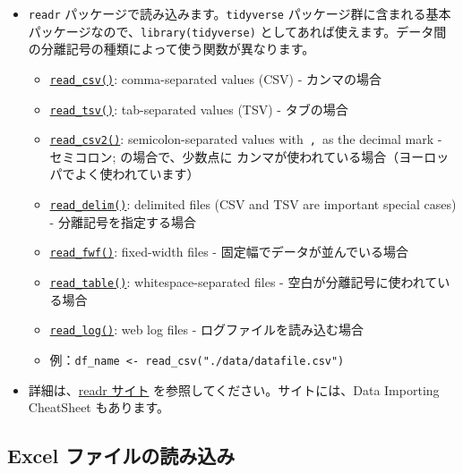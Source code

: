 \documentclass[
  xelatex, ja=standard]{bxjsbook}
\theoremstyle{definition}
\theoremstyle{definition}
\theoremstyle{definition}
\theoremstyle{definition}
\theoremstyle{remark}
\begin{document}
\begin{itemize}
\item
  \texttt{readr} パッケージで読み込みます。\texttt{tidyverse} パッケージ群に含まれる基本パッケージなので、\texttt{library(tidyverse)} としてあれば使えます。データ間の分離記号の種類によって使う関数が異なります。

  \begin{itemize}
  \item
    \href{https://readr.tidyverse.org/reference/read_delim.html}{\texttt{read\_csv()}}: comma-separated values (CSV) - カンマの場合
  \item
    \href{https://readr.tidyverse.org/reference/read_delim.html}{\texttt{read\_tsv()}}: tab-separated values (TSV) - タブの場合
  \item
    \href{https://readr.tidyverse.org/reference/read_delim.html}{\texttt{read\_csv2()}}: semicolon-separated values with~\texttt{,}~as the decimal mark - セミコロン; の場合で、少数点に カンマが使われている場合（ヨーロッパでよく使われています）
  \item
    \href{https://readr.tidyverse.org/reference/read_delim.html}{\texttt{read\_delim()}}: delimited files (CSV and TSV are important special cases) - 分離記号を指定する場合
  \item
    \href{https://readr.tidyverse.org/reference/read_fwf.html}{\texttt{read\_fwf()}}: fixed-width files - 固定幅でデータが並んでいる場合
  \item
    \href{https://readr.tidyverse.org/reference/read_table.html}{\texttt{read\_table()}}: whitespace-separated files - 空白が分離記号に使われている場合
  \item
    \href{https://readr.tidyverse.org/reference/read_log.html}{\texttt{read\_log()}}: web log files - ログファイルを読み込む場合
  \item
    例：\texttt{df\_name\ \textless{}-\ read\_csv("./data/datafile.csv")}
  \end{itemize}
\item
  詳細は、\href{https://readr.tidyverse.org}{readr サイト} を参照してください。サイトには、Data Importing CheatSheet もあります。
\end{itemize}

\hypertarget{excel-ux30d5ux30a1ux30a4ux30ebux306eux8aadux307fux8fbcux307f}{%
\subsection{Excel ファイルの読み込み}\label{excel-ux30d5ux30a1ux30a4ux30ebux306eux8aadux307fux8fbcux307f}}
\end{document}
